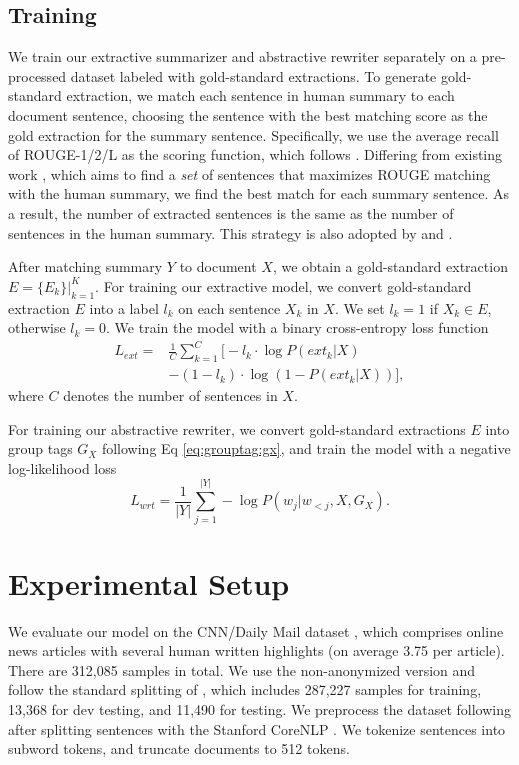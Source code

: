 \documentclass[letterpaper]{article} %
\begin{document}
\subsection{Training}
\label{method:train}
We train our extractive summarizer and abstractive rewriter separately on a pre-processed dataset labeled with gold-standard extractions.
To generate gold-standard extraction, we match each sentence in human summary to each document sentence, choosing the sentence with the best matching score as the gold extraction for the summary sentence. Specifically, we use the average recall of ROUGE-1/2/L as the scoring function, which follows \citet{Wei2019}.
Differing from existing work \cite{Liu2019}, which aims to find a {\it set} of sentences that maximizes ROUGE matching with the human summary, we find the best match for each summary sentence. As a result, the number of extracted sentences is the same as the number of sentences in the human summary. This strategy is also adopted by \citet{Wei2019} and \citet{Bae2019}.

After matching summary $Y$ to document $X$, we obtain a gold-standard extraction $E=\{E_k\}|_{k=1}^{K}$. 
For training our extractive model, we convert gold-standard extraction $E$ into a label $l_k$ on each sentence $X_k$ in $X$. We set $l_k=1$ if $X_k \in E$, otherwise $l_k=0$.  We train the model with a binary cross-entropy loss function
\begin{equation}
\begin{aligned}
  L_{ext} = &\frac{1}{C} \sum_{k=1}^{C} \big[ - l_k \cdot \log P(ext_k|X)\\
  & - (1 - l_k) \cdot \log (1 - P(ext_k|X)) \big] ,
\end{aligned}
\end{equation}
where $C$ denotes the number of sentences in $X$.

For training our abstractive rewriter, we convert gold-standard extractions $E$ into group tags $G_X$ following Eq \ref{eq:grouptag:gx}, and train the model with a negative log-likelihood loss
\begin{equation}
  L_{wrt} = \frac{1}{|Y|} \sum_{j=1}^{|Y|} - \log P(w_j|w_{<j},X,G_X).
\end{equation}


\section{Experimental Setup}
We evaluate our model on the CNN/Daily Mail dataset \cite{Hermann2015}, which comprises online news articles with several human written highlights (on average 3.75 per article). There are 312,085 samples in total. We use the non-anonymized version and follow the standard splitting of \citet{Hermann2015}, which includes 287,227 samples for training, 13,368 for dev testing, and 11,490 for testing. 
We preprocess the dataset following \citet{See2017} after splitting sentences with the Stanford CoreNLP \cite{Manning2014}. We tokenize sentences into subword tokens, and truncate documents to 512 tokens.
\end{document}
